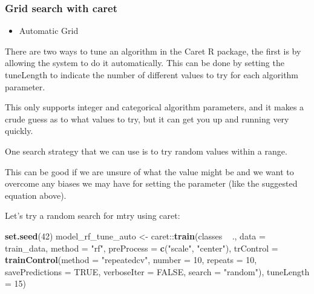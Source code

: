 \documentclass[]{article}
\newenvironment{Shaded}{\begin{snugshade}}{\end{snugshade}}
\newcommand{\KeywordTok}[1]{\textcolor[rgb]{0.13,0.29,0.53}{\textbf{{#1}}}}
\newcommand{\DataTypeTok}[1]{\textcolor[rgb]{0.13,0.29,0.53}{{#1}}}
\newcommand{\DecValTok}[1]{\textcolor[rgb]{0.00,0.00,0.81}{{#1}}}
\newcommand{\StringTok}[1]{\textcolor[rgb]{0.31,0.60,0.02}{{#1}}}
\newcommand{\OtherTok}[1]{\textcolor[rgb]{0.56,0.35,0.01}{{#1}}}
\newcommand{\NormalTok}[1]{{#1}}
\providecommand{\tightlist}{%
  \setlength{\itemsep}{0pt}\setlength{\parskip}{0pt}}
\begin{document}
\subsubsection{Grid search with caret}\label{grid-search-with-caret}

\begin{itemize}
\tightlist
\item
  Automatic Grid
\end{itemize}

There are two ways to tune an algorithm in the Caret R package, the
first is by allowing the system to do it automatically. This can be done
by setting the tuneLength to indicate the number of different values to
try for each algorithm parameter.

This only supports integer and categorical algorithm parameters, and it
makes a crude guess as to what values to try, but it can get you up and
running very quickly.

One search strategy that we can use is to try random values within a
range.

This can be good if we are unsure of what the value might be and we want
to overcome any biases we may have for setting the parameter (like the
suggested equation above).

Let's try a random search for mtry using caret:

\begin{Shaded}
\begin{Highlighting}[]
\KeywordTok{set.seed}\NormalTok{(}\DecValTok{42}\NormalTok{)}
\NormalTok{model_rf_tune_auto <-}\StringTok{ }\NormalTok{caret::}\KeywordTok{train}\NormalTok{(classes ~}\StringTok{ }\NormalTok{.,}
                         \DataTypeTok{data =} \NormalTok{train_data,}
                         \DataTypeTok{method =} \StringTok{"rf"}\NormalTok{,}
                         \DataTypeTok{preProcess =} \KeywordTok{c}\NormalTok{(}\StringTok{"scale"}\NormalTok{, }\StringTok{"center"}\NormalTok{),}
                         \DataTypeTok{trControl =} \KeywordTok{trainControl}\NormalTok{(}\DataTypeTok{method =} \StringTok{"repeatedcv"}\NormalTok{, }
                                                  \DataTypeTok{number =} \DecValTok{10}\NormalTok{, }
                                                  \DataTypeTok{repeats =} \DecValTok{10}\NormalTok{, }
                                                  \DataTypeTok{savePredictions =} \OtherTok{TRUE}\NormalTok{, }
                                                  \DataTypeTok{verboseIter =} \OtherTok{FALSE}\NormalTok{,}
                                                  \DataTypeTok{search =} \StringTok{"random"}\NormalTok{),}
                         \DataTypeTok{tuneLength =} \DecValTok{15}\NormalTok{)}
\end{Highlighting}
\end{Shaded}
\end{document}
